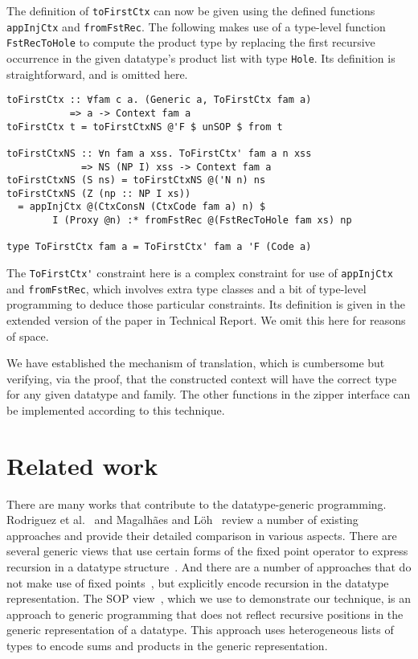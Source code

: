 \documentclass[runningheads]{llncs}
\newcommand{\K}[1]{\lstinline{#1}}
\begin{document}
The definition of \K{toFirstCtx} can now be given using the defined functions \K{appInjCtx} and \K{fromFstRec}. The following makes use of a type-level function \K{FstRecToHole} to compute the product type by replacing the first recursive occurrence in the given datatype's product list with type \K{Hole}. Its definition is straightforward, and is omitted here.
\begin{lstlisting}
toFirstCtx :: ∀fam c a. (Generic a, ToFirstCtx fam a)
           => a -> Context fam a
toFirstCtx t = toFirstCtxNS @'F $ unSOP $ from t

toFirstCtxNS :: ∀n fam a xss. ToFirstCtx' fam a n xss
             => NS (NP I) xss -> Context fam a
toFirstCtxNS (S ns) = toFirstCtxNS @('N n) ns
toFirstCtxNS (Z (np :: NP I xs))
  = appInjCtx @(CtxConsN (CtxCode fam a) n) $
        I (Proxy @n) :* fromFstRec @(FstRecToHole fam xs) np

type ToFirstCtx fam a = ToFirstCtx' fam a 'F (Code a)
\end{lstlisting}
The \K{ToFirstCtx'} constraint here is a complex constraint for use of \K{appInjCtx} and \K{fromFstRec}, which involves extra type classes and a bit of type-level programming to deduce those particular constraints. Its definition is given in the extended version of the paper in Technical Report. We omit this here for reasons of space.

We have established the mechanism of translation, which is cumbersome but verifying, via the proof, that the constructed context will have the correct type for any given datatype and family. The other functions in the zipper interface can be implemented according to this technique.


\section{Related work}
\label{sec:related-work}

There are many works that contribute to the datatype-generic programming. Rodriguez et al.~\cite{Rodriguez2008} and Magalh{\~{a}}es and L{\"{o}}h~\cite{MagLoeh2012} review a number of existing approaches and provide their detailed comparison in various aspects. There are several generic views that use certain forms of the fixed point operator to express recursion in a datatype structure~\cite{VanNoort2008,MuRec2009,Jansson1997,Loeh2011}. And there are a number of approaches that do not make use of fixed points~\cite{Chakravarty2009,Cheney2002,Magalhaes2010,Weirich2006}, but explicitly encode recursion in the datatype representation. The SOP view~\cite{VriLoeh2014}, which we use to demonstrate our technique, is an approach to generic programming that does not reflect recursive positions in the generic representation of a datatype. This approach uses heterogeneous lists of types to encode sums and products in the generic representation.
\end{document}
